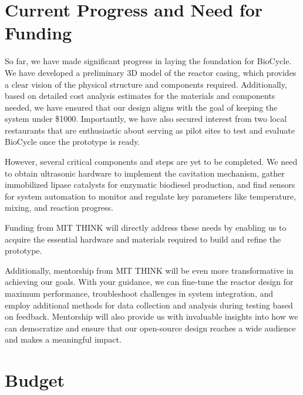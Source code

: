 \documentclass[10pt,twocolumn]{article}
\begin{document}
\section*{Current Progress and Need for Funding}
So far, we have made significant progress in laying the foundation for BioCycle. We have developed a preliminary 3D model of the reactor casing, which provides a clear vision of the physical structure and components required. Additionally, based on detailed cost analysis estimates for the materials and components needed, we have ensured that our design aligns with the goal of keeping the system under \$1000. Importantly, we have also secured interest from two local restaurants that are enthusiastic about serving as pilot sites to test and evaluate BioCycle once the prototype is ready. 

However, several critical components and steps are yet to be completed. We need to obtain ultrasonic hardware to implement the cavitation mechanism, gather immobilized lipase catalysts for enzymatic biodiesel production, and find sensors for system automation to monitor and regulate key parameters like temperature, mixing, and reaction progress. 

Funding from MIT THINK will directly address these needs by enabling us to acquire the essential hardware and materials required to build and refine the prototype. 

Additionally, mentorship from MIT THINK will be even more transformative in achieving our goals. With your guidance, we can fine-tune the reactor design for maximum performance, troubleshoot challenges in system integration, and employ additional methods for data collection and analysis during testing based on feedback. Mentorship will also provide us with invaluable insights into how we can democratize and ensure that our open-source design reaches a wide audience and makes a meaningful impact.

\section*{Budget}
\end{document}
